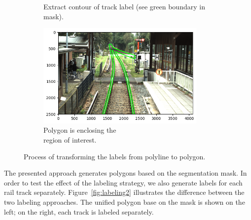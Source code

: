 \documentclass[Master,MDS,english]{BASE/twbook} %
\begin{document}
\begin{figure}
\begin{subfigure}[t]{.5\textwidth}
  \caption{Extract contour of track label (see green boundary in mask).}
\end{subfigure}%
\begin{subfigure}[t]{.5\textwidth}
  \centering
  \includegraphics[width=0.9\textwidth]{images/labeling/final}
  \caption{Polygon is enclosing the \\ region of interest.}
\end{subfigure}
\caption{Process of transforming the labels from  polyline to polygon.}
\label{fig:labeling}
\end{figure}


The presented approach generates polygons based on the segmentation mask. In order to test the effect of the labeling strategy, we also generate labels for each rail track separately. Figure~\ref{fig:labeling2} illustrates the difference between the two labeling approaches. The unified polygon base on the mask is shown on the left; on the right, each track is labeled separately.
\end{document}
